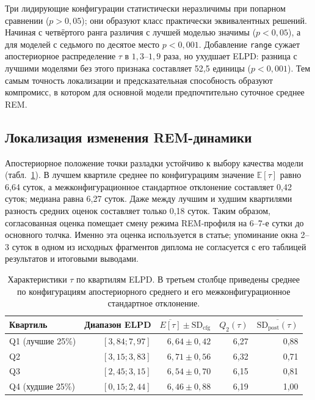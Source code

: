 \documentclass[14pt]{mmcs_article}
\begin{document}
Три лидирующие конфигурации статистически неразличимы при попарном
сравнении ($p>0{,}05$); они образуют класс практически эквивалентных
решений. Начиная с четвёртого ранга различия с лучшей моделью значимы
($p<0{,}05$), а для моделей с седьмого по десятое место
$p<0{,}001$. Добавление \texttt{range} сужает апостериорное
распределение $\tau$ в $1{,}3$--$1{,}9$ раза, но ухудшает ELPD:
разница с лучшими моделями без этого признака составляет 52,5 единицы
($p<0{,}001$). Тем самым точность локализации и предсказательная
способность образуют компромисс, в котором для основной модели
предпочтительно суточное среднее REM.

\subsection{Локализация изменения REM-динамики}

Апостериорное положение точки разладки устойчиво к выбору качества
модели (табл.~\ref{tab:tau}). В лучшем квартиле среднее по
конфигурациям значение $\mathbb E[\tau]$ равно 6,64 суток, а
межконфигурационное стандартное отклонение составляет 0,42 суток;
медиана равна 6,27 суток. Даже между лучшим и худшим квартилями
разность средних оценок составляет только 0,18 суток. Таким образом,
согласованная оценка помещает смену режима REM-профиля на 6--7-е сутки
до основного толчка.
Именно эта оценка используется в статье; упоминание окна 2--3 суток в
одном из исходных фрагментов диплома не согласуется с его таблицей
результатов и итоговыми выводами.

\begin{table}[H]
\centering
\caption{Характеристики $\tau$ по квартилям ELPD. В третьем столбце
приведены среднее по конфигурациям апостериорного среднего и его
межконфигурационное стандартное отклонение.}
\label{tab:tau}
\begin{tabular}{lrrrr}
\toprule
Квартиль & Диапазон ELPD &
$\overline{E[\tau]}\pm\mathrm{SD}_{\mathrm{cfg}}$ &
$Q_2(\tau)$ &
$\overline{\mathrm{SD}_{\mathrm{post}}(\tau)}$\\
\midrule
Q1 (лучшие 25\%) & $[3{,}84;7{,}97]$ & $6{,}64\pm0{,}42$ & 6,27 & 0,88\\
Q2 & $[3{,}15;3{,}83]$ & $6{,}71\pm0{,}56$ & 6,32 & 0,71\\
Q3 & $[2{,}45;3{,}15]$ & $6{,}54\pm0{,}70$ & 6,15 & 0,81\\
Q4 (худшие 25\%) & $[0{,}15;2{,}44]$ & $6{,}46\pm0{,}88$ & 6,19 & 1,00\\
\bottomrule
\end{tabular}
\end{table}
\end{document}
